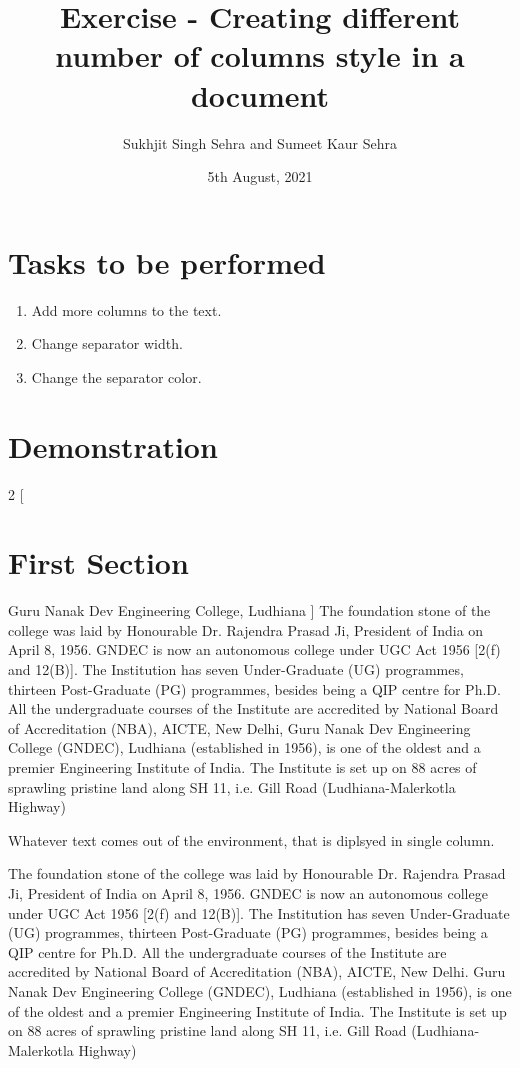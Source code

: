 \documentclass{article}
\title{Exercise  - Creating different number of columns style in a document}
\author{Sukhjit Singh Sehra and Sumeet Kaur Sehra}
\date{5th August, 2021}
\begin{document}
	\maketitle	
	\section*{Tasks to be performed}
	\begin{enumerate}	
		\item Add more columns to the text.
		\item Change separator width.
		\item Change the separator color.
		\end{enumerate}
	\section*{Demonstration}
	\begin{multicols}{2}
		[
		\section{First Section}
		Guru Nanak Dev Engineering College, Ludhiana
		]
				 The foundation stone of the college
				 was laid by Honourable Dr. Rajendra Prasad Ji, President of India on April 8,
				 1956. GNDEC is now an autonomous college under UGC Act 1956 [2(f) and
				 12(B)]. The Institution has seven Under-Graduate (UG) programmes,
				 thirteen Post-Graduate (PG) programmes, besides being a QIP centre for
				 Ph.D. All the undergraduate courses of the Institute are accredited by
				 National Board of Accreditation (NBA), AICTE, New Delhi, Guru Nanak Dev Engineering College (GNDEC), Ludhiana (established in
				 1956), is one of the oldest and a premier Engineering Institute of India. The
				 Institute is set up on 88 acres of sprawling pristine land along SH 11, i.e. Gill
				 Road (Ludhiana-Malerkotla Highway)
	\end{multicols}
	Whatever text comes out of the environment, that is diplsyed in single column.
	

The foundation stone of the college
was laid by Honourable Dr. Rajendra Prasad Ji, President of India on April 8,
1956. GNDEC is now an autonomous college under UGC Act 1956 [2(f) and
12(B)]. The Institution has seven Under-Graduate (UG) programmes,
thirteen Post-Graduate (PG) programmes, besides being a QIP centre for
Ph.D. All the undergraduate courses of the Institute are accredited by
National Board of Accreditation (NBA), AICTE, New Delhi. 	Guru Nanak Dev Engineering College (GNDEC), Ludhiana (established in
1956), is one of the oldest and a premier Engineering Institute of India. The
Institute is set up on 88 acres of sprawling pristine land along SH 11, i.e. Gill
Road (Ludhiana-Malerkotla Highway)
\end{document}
